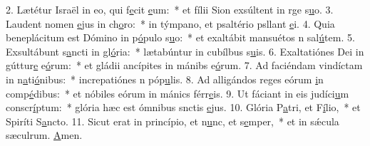 2. Lætétur Israël in eo, qui f\uline{e}cit \uline{e}um:~* et fílii Sion exsúltent in rge s\uline{u}o.
3. Laudent nomen \uline{e}jus in ch\uline{o}ro:~* in týmpano, et psaltério psllant \uline{e}i.
4. Quia beneplácitum est Dómino in p\uline{ó}pulo s\uline{u}o:~* et exaltábit mansuétos n sal\uline{ú}tem.
5. Exsultábunt s\uline{a}ncti in gl\uline{ó}ria:~* lætabúntur in cubílbus s\uline{u}is.
6. Exaltatiónes Dei in gúttur\uline{e} e\uline{ó}rum:~* et gládii ancípites in mánibs e\uline{ó}rum.
7. Ad faciéndam vindíctam in n\uline{a}ti\uline{ó}nibus:~* increpatiónes n póp\uline{u}lis.
8. Ad alligándos reges eórum \uline{i}n comp\uline{é}dibus:~* et nóbiles eórum in mánics férr\uline{e}is.
9. Ut fáciant in eis judíci\uline{u}m conscr\uline{í}ptum:~* glória hæc est ómnibus snctis \uline{e}jus.
10. Glória P\uline{a}tri, et F\uline{í}lio,~* et Spiríti S\uline{a}ncto.
11. Sicut erat in princípio, et n\uline{u}nc, et s\uline{e}mper,~* et in sǽcula sæculrum. \uline{A}men.

